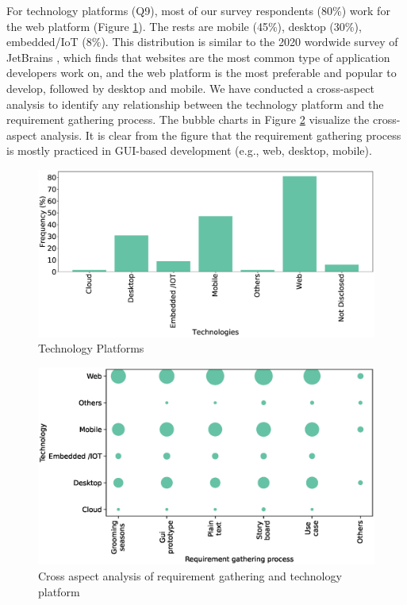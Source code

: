 For technology platforms (Q9), most of our survey respondents (80\%) work for the web
platform (Figure \ref{fig:platforms}). The rests are mobile (45\%), desktop (30\%), embedded/IoT
(8\%). This distribution is similar to the 2020 wordwide survey of JetBrains \cite{JetBrains2020}, which finds that 
websites are the
most common type of application developers work on, and the web platform is the
most preferable and popular to develop, followed by desktop and mobile. We have conducted a cross-aspect analysis to identify any relationship
between the technology platform and the requirement gathering process. The
bubble charts in Figure \ref{fig:requirement technology cross analysis}
visualize the cross-aspect analysis. It is clear from the figure that the
requirement gathering process is mostly practiced in GUI-based development
(e.g., web, desktop, mobile).
\begin{figure}[t]
\centering
  \includegraphics[scale=0.18]{Figures/Respondents_Technologies}
  \caption{Technology Platforms}
  \label{fig:platforms}
\end{figure}
\begin{figure}[t]
\centering
  \includegraphics[scale=0.47]{Figures/Requirement_Technology_Cross_Analysis.eps}
  \caption{Cross aspect analysis of requirement gathering and technology platform}
  \label{fig:requirement technology cross analysis}
\end{figure}

